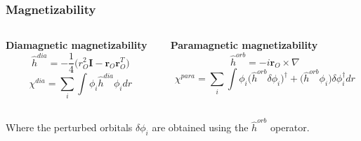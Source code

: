 \begin{frame}
\frametitle{Magnetizability}
\begin{columns}

\begin{column}[b]{0.5\textwidth}
\centering
\textbf{Diamagnetic magnetizability}
\begin{equation}
    \nonumber
    \hat{h}^{dia} = -\frac{1}{4}\Big(r_O^2\boldsymbol{I} - 
    \boldsymbol{r}_O\boldsymbol{r}_O^T\Big)
\end{equation}
\vspace{2mm}
\begin{equation}
    \nonumber
    \chi^{dia} = \sum_i \int \phi_i \hat{h}^{dia} \phi_i dr
\end{equation}
\end{column}

\begin{column}[b]{0.5\textwidth}
\centering
\textbf{Paramagnetic magnetizability}
\begin{equation}
    \nonumber
    \hat{h}^{orb} = -i \boldsymbol{r}_O\times\nabla
\end{equation}
\vspace{2mm}
\begin{equation}
    \nonumber
    \chi^{para} = \sum_i \int \phi_i \Big(\hat{h}^{orb} \delta\phi_i\Big)^\dag + 
    \Big(\hat{h}^{orb}\phi_i\Big)\delta\phi_i^\dag dr
\end{equation}
\end{column}

\end{columns}
\vspace{5mm}
\centering
Where the perturbed orbitals $\delta\phi_i$ are obtained using 
the $\hat{h}^{orb}$ operator.
\vspace{5mm}


\end{frame}
